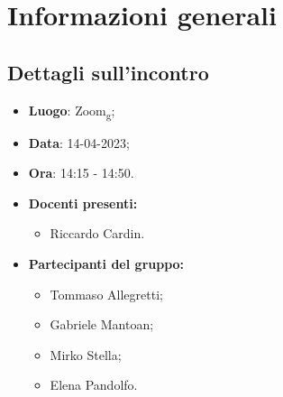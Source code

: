 \section{Informazioni generali}

\subsection{Dettagli sull'incontro}
\begin{itemize}
    \item \textbf{Luogo}: Zoom\textsubscript{g};
    \item \textbf{Data}: 14-04-2023;
    \item \textbf{Ora}: 14:15 - 14:50.
    \item \textbf{Docenti presenti:}
        \begin{itemize}
            \item Riccardo Cardin.
        \end{itemize}
    \item \textbf{Partecipanti del gruppo:}
        \begin{itemize}
            \item Tommaso Allegretti;
            \item Gabriele Mantoan;
            \item Mirko Stella;
            \item Elena Pandolfo.
        \end{itemize}
\end{itemize}